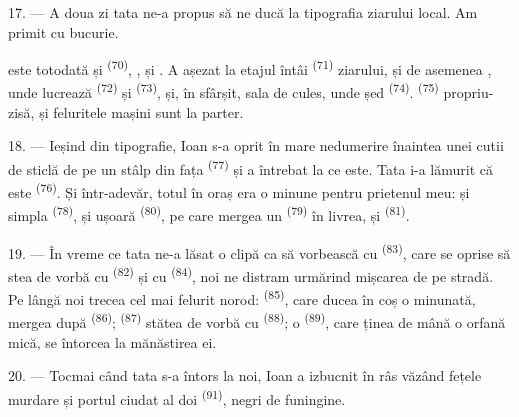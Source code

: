 \VUsaut{3.0mm}

17. --- A doua zi tata ne-a propus să ne ducă la tipografia ziarului local. Am
primit cu bucurie.

 este totodată și  \textsuperscript{(70)},
,  și . A așezat la etajul întâi
 \textsuperscript{(71)} ziarului, și de asemenea
, unde lucrează  \textsuperscript{(72)} și
 \textsuperscript{(73)}, și, în sfârșit, sala de cules,
unde șed  \textsuperscript{(74)}. 
\textsuperscript{(75)} propriu-zisă,  și feluritele
mașini sunt la parter.

\VUsaut{3.0mm}

18. --- Ieșind din tipografie, Ioan s-a oprit în mare nedumerire înaintea unei
cutii de sticlă de pe un stâlp din fața 
\textsuperscript{(77)} și a întrebat la ce este. Tata i-a lămurit că este
 \textsuperscript{(76)}. Și într-adevăr, totul în
oraș era o minune pentru prietenul meu: și simpla 
\textsuperscript{(78)}, și  ușoară
\textsuperscript{(80)}, pe care mergea un 
\textsuperscript{(79)} în livrea, și 
\textsuperscript{(81)}.

19. --- În vreme ce tata ne-a lăsat o clipă ca să vorbească cu 
\textsuperscript{(83)}, care se oprise să stea de vorbă cu 
\textsuperscript{(82)} și cu  \textsuperscript{(84)}, noi ne
distram urmărind mișcarea de pe stradă. Pe lângă noi trecea cel mai felurit norod:
 \textsuperscript{(85)}, care ducea în coș o
 minunată, mergea după  \textsuperscript{(86)};
 \textsuperscript{(87)} stătea de vorbă cu  \textsuperscript{(88)}; o  \textsuperscript{(89)}, care
ținea de mână o orfană mică, se întorcea la mănăstirea ei.

\VUsaut{3.0mm}

20. --- Tocmai când tata s-a întors la noi, Ioan a izbucnit în râs văzând fețele
murdare și portul ciudat al doi  \textsuperscript{(91)}, negri de
funingine.

